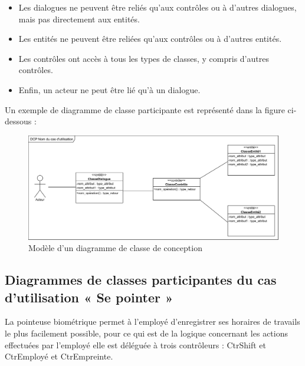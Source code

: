 \begin{itemize}
    \item[\textbullet] Les dialogues ne peuvent être reliés qu'aux contrôles ou à 
        d'autres dialogues, mais pas directement aux entités.
    \item [\textbullet] Les entités ne peuvent être reliées qu'aux contrôles ou à 
        d'autres entités.
    \item [\textbullet] Les contrôles ont accès à tous les types de classes, y 
        compris d'autres contrôles.
    \item [\textbullet] Enfin, un acteur ne peut être lié qu'à un dialogue.
\end{itemize}

Un exemple de diagramme de classe participante est représenté dans la figure 
ci-dessous :  

\begin{figure}[h!]
    \centering
    \includegraphics[scale=0.78]{images/DCP_exemple.png}
    \caption{Modèle d'un diagramme de classe de conception}
    \label{fig23}
\end{figure}

\clearpage

\subsection*{Diagrammes de classes participantes du cas d'utilisation « Se pointer »}
La pointeuse biométrique permet à l’employé d’enregistrer ses horaires de 
travails le plus facilement possible, pour ce qui est de la logique concernant 
les actions effectuées par l’employé elle est déléguée à trois contrôleurs : 
CtrShift et CtrEmployé et CtrEmpreinte.
            
